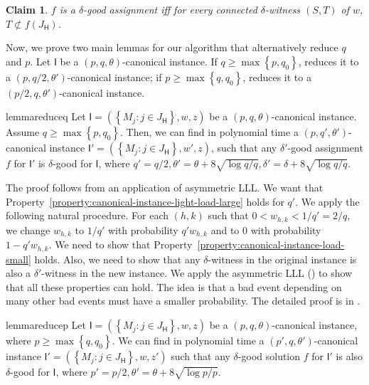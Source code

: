 \documentclass[11pt]{article}
\newtheorem{claim}{Claim}[section]
\newtheorem{claim}[lemma]{Claim}
\newcounter{prop}
\newcommand{\set}[1]{\left\{#1\right\}}
\newcommand{\cI}{{\mathsf I}}
\newcommand{\sfH}{{\mathsf H}}
\begin{document}
\begin{claim}
\label{claim:alpha-good-equivalent-to-no-witness}
\label{clm:alpha-good-equivalent-to-no-witness}
$f$ is a $\delta$-good assignment iff for every connected $\delta$-witness $(S, T)$ of $w$, $T \not \subset f({J_\sfH})$.
\end{claim}

Now, we prove two main lemmas for our algorithm that alternatively reduce $q$ and $p$.   Let $\cI$ be a $(p, q, \theta)$-canonical instance. If $q \geq \max\set{p, q_0}$,  reduces it to a $(p, q/2, \theta')$-canonical instance; if $p \geq \max\set{q, q_0}$,  reduces it to a $(p/2, q, \theta')$-canonical instance. 

\begin{restatable}{lemma}{reduceq}
\label{lemma:reduce-q}\label{lem:reduce-q}
 Let $\cI = \left(\set{M_j : j \in {J_\sfH}}, w, z \right)$ be a $(p, q, \theta)$-canonical instance. Assume $q \geq \max\set{p, q_0}$.  Then, we can find in polynomial time a $(p, q', \theta')$-canonical instance $\cI' = \left(\set{M_j:j \in {J_\sfH}}, w', z\right)$, such that any $\delta'$-good assignment $f$ for $\cI'$ is $\delta$-good for $\cI$, where $q' = q/2, \theta' = \theta + 8\sqrt{\log q/q}, \delta' = \delta + 8\sqrt{\log q/q}$.
\end{restatable}

The proof follows from an application of asymmetric LLL. We want that Property~\ref{property:canonical-instance-light-load-large} holds for $q'$.  We apply the following natural procedure. For each $(h, k)$ such that $0 < w_{h,k} < 1/q' = 2/q$, we change $w_{h,k}$ to $1/q'$ with probability $q'w_{h,k}$ and to $0$ with probability $1-q'w_{h,k}$. We need to show that Property~\ref{property:canonical-instance-load-small} holds. Also, we need to show that any $\delta$-witness in the original instance is also a $\delta'$-witness in the new instance. We apply the asymmetric LLL () to show that all these properties can hold.  The idea is that a bad event depending on many other bad events must have a smaller probability.  The detailed proof is in .

\begin{restatable}{lemma}{reducep}
\label{lemma:reduce-p}\label{lem:reduce-p}
 Let $\cI = \left(\set{M_j : j \in {J_\sfH}}, w,  z\right)$ be a $(p, q, \theta)$-canonical instance, where $p \geq \max\set{q, q_0}$.  We can find in polynomial time a $(p', q, \theta')$-canonical instance $\cI' = \left(\set{M_j : j \in {J_\sfH}}, w, z'\right)$ such that any $\delta$-good solution $f$ for $\cI'$ is also $\delta$-good for $\cI$, where $p' =  p/2, \theta' = \theta + 8\sqrt{\log p/p}$.
\end{restatable}
\end{document}
